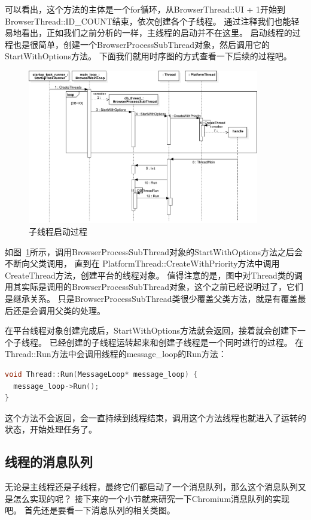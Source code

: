 可以看出，这个方法的主体是一个for循环，从BrowserThread::UI + 1开始到BrowserThread::ID_COUNT结束，依次创建各个子线程。
通过注释我们也能轻易地看出，正如我们之前分析的一样，主线程的启动并不在这里。
启动线程的过程也是很简单，创建一个BrowserProcessSubThread对象，然后调用它的StartWithOptions方法。
下面我们就用时序图的方式查看一下后续的过程吧。

\begin{figure}[H] 
  \centering 
  \includegraphics[width=0.90\textwidth]{image/process_study/SubThreadStartSuquence.pdf} 
  \caption{子线程启动过程} \label{fig:SubThreadStartSuquence} 
\end{figure}

如图~\ref{fig:SubThreadStartSuquence}所示，调用BrowserProcessSubThread对象的StartWithOptions方法之后会不断向父类调用，
直到在 PlatformThread::CreateWithPriority方法中调用CreateThread方法，创建平台的线程对象。
值得注意的是，图中对Thread类的调用其实际是调用的BrowserProcessSubThread对象，这个之前已经说明过了，它们是继承关系。
只是BrowserProcessSubThread类很少覆盖父类方法，就是有覆盖最后还是会调用父类的处理。

在平台线程对象创建完成后，StartWithOptions方法就会返回，接着就会创建下一个子线程。
已经创建的子线程运转起来和创建子线程是一个同时进行的过程。
在Thread::Run方法中会调用线程的message_loop的Run方法：
\begin{spacing}{1.0}
\begin{lstlisting}[language={C++}]
void Thread::Run(MessageLoop* message_loop) {
  message_loop->Run();
}
\end{lstlisting}
\end{spacing}
这个方法不会返回，会一直持续到线程结束，调用这个方法线程也就进入了运转的状态，开始处理任务了。

\subsection{线程的消息队列}
无论是主线程还是子线程，最终它们都启动了一个消息队列，那么这个消息队列又是怎么实现的呢？
接下来的一个小节就来研究一下Chromium消息队列的实现吧。
首先还是要看一下消息队列的相关类图。

